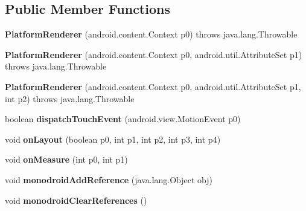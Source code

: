 \subsection*{Public Member Functions}
\begin{DoxyCompactItemize}
\item 
\mbox{\label{classmd5b60ffeb829f638581ab2bb9b1a7f4f3f_1_1PlatformRenderer_a90bfbb67da58b02ff0166542312af648}} 
{\bfseries Platform\+Renderer} (android.\+content.\+Context p0)  throws java.\+lang.\+Throwable 	
\item 
\mbox{\label{classmd5b60ffeb829f638581ab2bb9b1a7f4f3f_1_1PlatformRenderer_a90fc0b6b4826200382896057d7702f7c}} 
{\bfseries Platform\+Renderer} (android.\+content.\+Context p0, android.\+util.\+Attribute\+Set p1)  throws java.\+lang.\+Throwable 	
\item 
\mbox{\label{classmd5b60ffeb829f638581ab2bb9b1a7f4f3f_1_1PlatformRenderer_a8177f3eb1c1c90d64ec568241b38a443}} 
{\bfseries Platform\+Renderer} (android.\+content.\+Context p0, android.\+util.\+Attribute\+Set p1, int p2)  throws java.\+lang.\+Throwable 	
\item 
\mbox{\label{classmd5b60ffeb829f638581ab2bb9b1a7f4f3f_1_1PlatformRenderer_a3e5da660e483bb06f7cefffd8f570ab8}} 
boolean {\bfseries dispatch\+Touch\+Event} (android.\+view.\+Motion\+Event p0)
\item 
\mbox{\label{classmd5b60ffeb829f638581ab2bb9b1a7f4f3f_1_1PlatformRenderer_aa62ffd461aef9e033818b416eacdac3d}} 
void {\bfseries on\+Layout} (boolean p0, int p1, int p2, int p3, int p4)
\item 
\mbox{\label{classmd5b60ffeb829f638581ab2bb9b1a7f4f3f_1_1PlatformRenderer_a08aa31496e02cae4a5b96c1668891094}} 
void {\bfseries on\+Measure} (int p0, int p1)
\item 
\mbox{\label{classmd5b60ffeb829f638581ab2bb9b1a7f4f3f_1_1PlatformRenderer_a35f1c22f204eb1766115df1f3ea8ebf8}} 
void {\bfseries monodroid\+Add\+Reference} (java.\+lang.\+Object obj)
\item 
\mbox{\label{classmd5b60ffeb829f638581ab2bb9b1a7f4f3f_1_1PlatformRenderer_a1c34b6a1a7883025d993d09095c6ee67}} 
void {\bfseries monodroid\+Clear\+References} ()
\end{DoxyCompactItemize}
